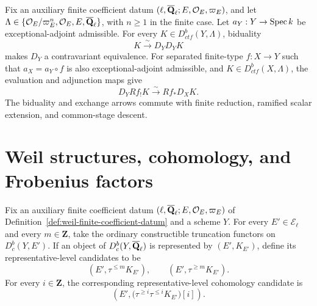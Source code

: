 \begin{proposition}
\label{prop:verdier-duality}


Fix an auxiliary finite coefficient datum
\((\ell,\overline{\mathbf Q}_\ell;E,\mathcal O_E,\varpi_E)\), and let
\(\Lambda\in\{\mathcal O_E/\varpi_E^n,\mathcal O_E,E,\overline{\mathbf Q}_\ell\}\), with
\(n\geq1\) in the finite case.  Let
\(a_Y:Y\to\operatorname{Spec} k\) be exceptional-adjoint admissible.  For every
\(K\in D^b_{ctf}(Y,\Lambda)\), biduality
\[
 K\xrightarrow{\sim}D_YD_YK
\]
makes \(D_Y\) a contravariant equivalence.  For separated finite-type
\(f:X\to Y\) such that \(a_X=a_Y\circ f\) is also
exceptional-adjoint admissible, and \(K\in D^b_{ctf}(X,\Lambda)\), the evaluation and
adjunction maps give
\[
 D_YRf_!K\xrightarrow{\sim}Rf_*D_XK.
\]
The biduality and exchange arrows commute with finite reduction, ramified
scalar extension, and common-stage descent.
\end{proposition}



\section{Weil structures, cohomology, and Frobenius factors}

\begin{definition}
\label{def:constructible-truncation-candidates}


Fix an auxiliary finite coefficient datum
\((\ell,\overline{\mathbf Q}_\ell;E,\mathcal O_E,\varpi_E)\) of
Definition~\ref{def:weil-finite-coefficient-datum} and a scheme \(Y\).
For every \(E'\in\mathcal E_\ell\) and every \(m\in\mathbf Z\), take the
ordinary constructible truncation functors on \(D^b_c(Y,E')\).  If an object
of \(D^b_c(Y,\overline{\mathbf Q}_\ell)\) is represented by \((E',K_{E'})\), define its
representative-level candidates
to be
\[
 (E',\tau^{\leq m}K_{E'}),\qquad
 (E',\tau^{\geq m}K_{E'}).
\]
For every \(i\in\mathbf Z\), the corresponding representative-level
cohomology candidate is
\[
 \left(E',\bigl(\tau^{\geq i}\tau^{\leq i}K_{E'}\bigr)[i]\right).
\]
\end{definition}


